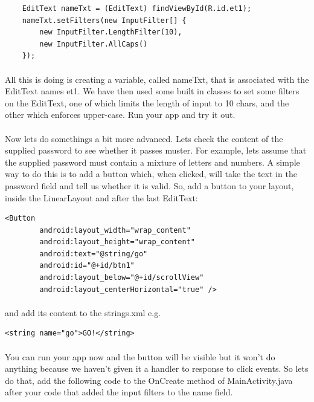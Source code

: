 \documentclass[12pt, a4paper, twoside]{book}
\begin{document}
\begin{lstlisting}
    EditText nameTxt = (EditText) findViewById(R.id.et1);
    nameTxt.setFilters(new InputFilter[] {
        new InputFilter.LengthFilter(10),
        new InputFilter.AllCaps()
    });
\end{lstlisting}

\paragraph{} All this is doing is creating a variable, called nameTxt, that is associated with the EditText names et1. We have then used some built in classes to set some filters on the EditText, one of which limits the length of input to 10 chars, and the other which enforces upper-case. Run your app and try it out.

\paragraph{} Now lets do somethings a bit more advanced. Lets check the content of the supplied password to see whether it passes muster. For example, lets assume that the supplied password must contain a mixture of letters and numbers. A simple way to do this is to add a button which, when clicked, will take the text in the password field and tell us whether it is valid. So, add a button to your layout, inside the LinearLayout and after the last EditText:

\begin{lstlisting}
<Button
        android:layout_width="wrap_content"
        android:layout_height="wrap_content"
        android:text="@string/go"
        android:id="@+id/btn1"
        android:layout_below="@+id/scrollView"
        android:layout_centerHorizontal="true" />
\end{lstlisting}

\paragraph{} and add its content to the strings.xml e.g.

\begin{lstlisting}
<string name="go">GO!</string>
\end{lstlisting}

\paragraph{} You can run your app now and the button will be visible but it won't do anything because we haven't given it a handler to response to click events. So lets do that, add the following code to the OnCreate method of MainActivity.java after your code that added the input filters to the name field.
\end{document}

